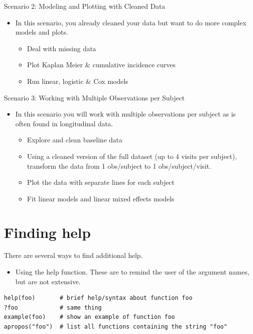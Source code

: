 \documentclass[
]{book}
\providecommand{\tightlist}{%
  \setlength{\itemsep}{0pt}\setlength{\parskip}{0pt}}
\begin{document}
Scenario 2: Modeling and Plotting with Cleaned Data

\begin{itemize}
\tightlist
\item
  In this scenario, you already cleaned your data but want to do more complex models and plots.

  \begin{itemize}
  \tightlist
  \item
    Deal with missing data
  \item
    Plot Kaplan Meier \& cumulative incidence curves
  \item
    Run linear, logistic \& Cox models
  \end{itemize}
\end{itemize}

Scenario 3: Working with Multiple Observations per Subject

\begin{itemize}
\tightlist
\item
  In this scenario you will work with multiple observations per subject as is often found in longitudinal data.

  \begin{itemize}
  \tightlist
  \item
    Explore and clean baseline data
  \item
    Using a cleaned version of the full dataset (up to 4 visits per subject), transform the data from 1 obs/subject to 1 obs/subject/visit.
  \item
    Plot the data with separate lines for each subject
  \item
    Fit linear models and linear mixed effects models
  \end{itemize}
\end{itemize}

\hypertarget{finding-help}{%
\section{Finding help}\label{finding-help}}

There are several ways to find additional help.

\begin{itemize}
\tightlist
\item
  Using the help function. These are to remind the user of the argument names, but are not extensive.
\end{itemize}

\begin{verbatim}
help(foo)       # brief help/syntax about function foo
?foo            # same thing
example(foo)    # show an example of function foo
apropos("foo")  # list all functions containing the string "foo"
\end{verbatim}
\end{document}
